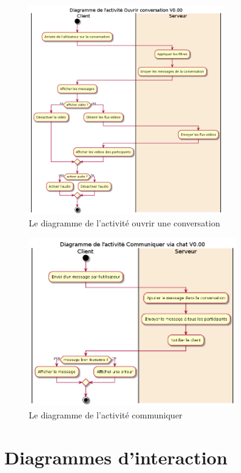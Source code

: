\documentclass[11pt,dvipsnames,svgnames]{report}
\begin{document}
\begin{figure}[H]
\centerline{\includegraphics[width=0.75\textwidth]{diagrammes/activity-openConv-diag.png}}
\caption{Le diagramme de l'activité \og ouvrir une conversation \fg}
\end{figure}

\begin{figure}[H]
\centerline{\includegraphics[width=0.8\textwidth]{diagrammes/activity-sendMsg-diag.png}}
\caption{Le diagramme de l'activité \og communiquer \fg}
\end{figure}

\section{Diagrammes d’interaction}
\end{document}
